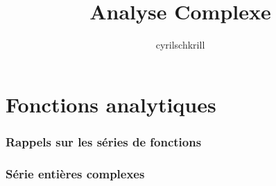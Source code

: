 \documentclass{article}
\title{Analyse Complexe}
\author{cyrilschkrill}
\begin{document}
\maketitle
\part{Fonctions analytiques}
\section{Rappels sur les séries de fonctions}
\section{Série entières complexes}
\end{document}
